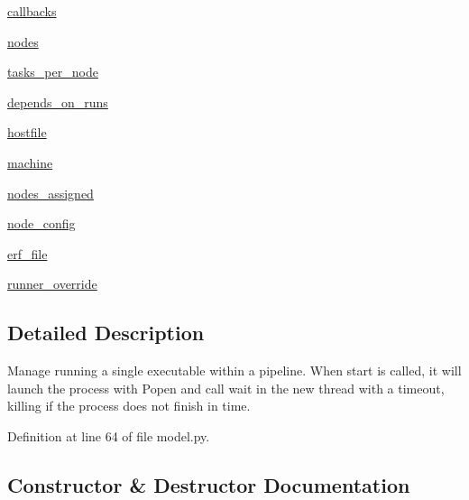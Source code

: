 \begin{DoxyCompactItemize}
\hyperlink{classcodar_1_1savanna_1_1model_1_1_run_a06db3daca41c4e1c60b22cf8abffb816}{callbacks}
\item 
\hyperlink{classcodar_1_1savanna_1_1model_1_1_run_ae89dacfde53aa2a2b453ef530ef2287c}{nodes}
\item 
\hyperlink{classcodar_1_1savanna_1_1model_1_1_run_a6aabe917777d9e07f1e8c6f64b8819b5}{tasks\+\_\+per\+\_\+node}
\item 
\hyperlink{classcodar_1_1savanna_1_1model_1_1_run_aa5202a9a7a6a7b928fbf808eab8defb5}{depends\+\_\+on\+\_\+runs}
\item 
\hyperlink{classcodar_1_1savanna_1_1model_1_1_run_af216be8820a6bedc05b5e613a03c862d}{hostfile}
\item 
\hyperlink{classcodar_1_1savanna_1_1model_1_1_run_a7cb03aedcb50de3ed5a9edf3b8d51ef0}{machine}
\item 
\hyperlink{classcodar_1_1savanna_1_1model_1_1_run_a83e17439a9119f1666bc8fbd6e5051e4}{nodes\+\_\+assigned}
\item 
\hyperlink{classcodar_1_1savanna_1_1model_1_1_run_aaebbd098b2bb5d929e0b85a71d408c31}{node\+\_\+config}
\item 
\hyperlink{classcodar_1_1savanna_1_1model_1_1_run_ab4b12fcc794061a18c7dca681c69389a}{erf\+\_\+file}
\item 
\hyperlink{classcodar_1_1savanna_1_1model_1_1_run_a687ceaaa3bd97a392487ea57b662e7a3}{runner\+\_\+override}
\end{DoxyCompactItemize}


\subsection{Detailed Description}
\begin{DoxyVerb}Manage running a single executable within a pipeline. When start is
called, it will launch the process with Popen and call wait in the new
thread with a timeout, killing if the process does not finish in time.\end{DoxyVerb}
 

Definition at line 64 of file model.\+py.



\subsection{Constructor \& Destructor Documentation}
\mbox{\label{classcodar_1_1savanna_1_1model_1_1_run_a796853700dcd65de0394fa521b0d5c21}} 
